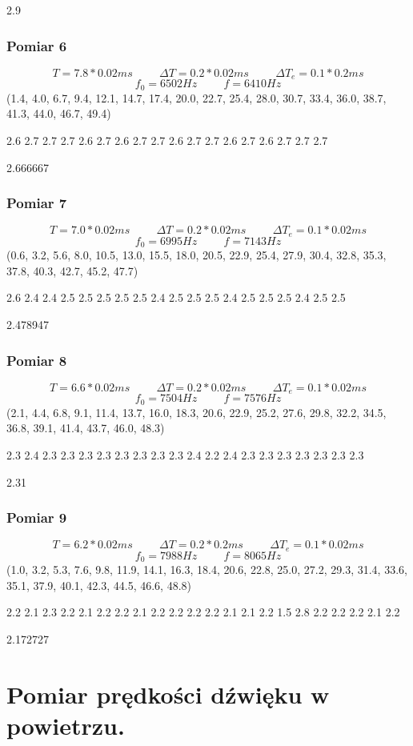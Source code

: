 \documentclass[12pt,a4paper]{article}
\begin{document}
2.9
\subsubsection{Pomiar 6}
$$
T = 7.8*0.02ms \hspace{1cm} \Delta T = 0.2*0.02ms \hspace{1cm} \Delta T_e = 0.1*0.2ms 
$$
$$
f_0 = 6502 Hz \hspace{1cm} f=6410Hz
$$
(1.4, 4.0, 6.7, 9.4, 12.1, 14.7, 17.4, 20.0, 22.7, 25.4, 28.0, 30.7, 33.4, 36.0, 38.7, 41.3, 44.0, 46.7, 49.4)

2.6 2.7 2.7 2.7 2.6 2.7 2.6 2.7 2.7 2.6 2.7 2.7 2.6 2.7 2.6 2.7 2.7 2.7

2.666667
\subsubsection{Pomiar 7}
$$
T = 7.0*0.02ms \hspace{1cm} \Delta T = 0.2*0.02ms \hspace{1cm} \Delta T_e = 0.1*0.02ms 
$$
$$
f_0 = 6995 Hz \hspace{1cm} f=7143Hz
$$
(0.6, 3.2, 5.6, 8.0, 10.5, 13.0, 15.5, 18.0, 20.5, 22.9, 25.4, 27.9, 30.4, 32.8, 35.3, 37.8, 40.3, 42.7, 45.2, 47.7)

2.6 2.4 2.4 2.5 2.5 2.5 2.5 2.5 2.4 2.5 2.5 2.5 2.4 2.5 2.5 2.5 2.4 2.5 2.5

2.478947
\subsubsection{Pomiar 8}
$$
T = 6.6*0.02ms \hspace{1cm} \Delta T = 0.2*0.02ms \hspace{1cm} \Delta T_e = 0.1*0.02ms 
$$
$$
f_0 = 7504 Hz \hspace{1cm} f=7576Hz
$$
(2.1, 4.4, 6.8, 9.1, 11.4, 13.7, 16.0, 18.3, 20.6, 22.9, 25.2, 27.6, 29.8, 32.2, 34.5, 36.8, 39.1, 41.4, 43.7, 46.0, 48.3)

2.3 2.4 2.3 2.3 2.3 2.3 2.3 2.3 2.3 2.3 2.4 2.2 2.4 2.3 2.3 2.3 2.3 2.3 2.3 2.3

2.31
\subsubsection{Pomiar 9}
$$
T = 6.2*0.02ms \hspace{1cm} \Delta T = 0.2*0.2ms \hspace{1cm} \Delta T_e = 0.1*0.02ms 
$$
$$
f_0 = 7988Hz \hspace{1cm} f=8065Hz
$$
(1.0, 3.2, 5.3, 7.6, 9.8, 11.9, 14.1, 16.3, 18.4, 20.6, 22.8, 25.0, 27.2, 29.3, 31.4, 33.6, 35.1, 37.9, 40.1, 42.3, 44.5, 46.6, 48.8)

2.2 2.1 2.3 2.2 2.1 2.2 2.2 2.1 2.2 2.2 2.2 2.2 2.1 2.1 2.2 1.5 2.8 2.2 2.2 2.2 2.1 2.2


2.172727
\section{Pomiar prędkości dźwięku w powietrzu.}
\end{document}
